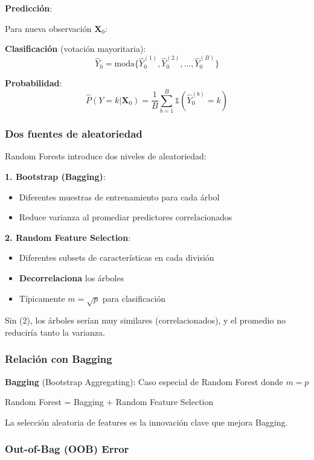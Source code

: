 \documentclass[
  doc,
  floatsintext,
  longtable,
  a4paper,
  nolmodern,
  notxfonts,
  notimes,
  12pt,
  colorlinks=true,linkcolor=blue,citecolor=blue,urlcolor=blue]{apa7}
\providecommand{\tightlist}{%
  \setlength{\itemsep}{0pt}\setlength{\parskip}{0pt}}
\begin{document}
\textbf{Predicción}:

Para nueva observación \(\mathbf{X}_0\):

\textbf{Clasificación} (votación mayoritaria): \[
\hat{Y}_0 = \text{moda}\{\hat{Y}_0^{(1)}, \hat{Y}_0^{(2)}, \ldots, \hat{Y}_0^{(B)}\}
\]

\textbf{Probabilidad}: \[
\hat{P}(Y=k|\mathbf{X}_0) = \frac{1}{B} \sum_{b=1}^{B} \mathbb{1}(\hat{Y}_0^{(b)} = k)
\]

\subsubsection{Dos fuentes de
aleatoriedad}\label{dos-fuentes-de-aleatoriedad}

Random Forests introduce dos niveles de aleatoriedad:

\textbf{1. Bootstrap (Bagging)}:

\begin{itemize}
\tightlist
\item
  Diferentes muestras de entrenamiento para cada árbol
\item
  Reduce varianza al promediar predictores correlacionados
\end{itemize}

\textbf{2. Random Feature Selection}:

\begin{itemize}
\tightlist
\item
  Diferentes subsets de características en cada división
\item
  \textbf{Decorrelaciona} los árboles
\item
  Típicamente \(m = \sqrt{p}\) para clasificación
\end{itemize}

Sin (2), los árboles serían muy similares (correlacionados), y el
promedio no reduciría tanto la varianza.

\subsubsection{Relación con Bagging}\label{relaciuxf3n-con-bagging}

\textbf{Bagging} (Bootstrap Aggregating): Caso especial de Random Forest
donde \(m = p\)

Random Forest = Bagging + Random Feature Selection

La selección aleatoria de features es la innovación clave que mejora
Bagging.

\subsubsection{Out-of-Bag (OOB) Error}\label{out-of-bag-oob-error}
\end{document}
